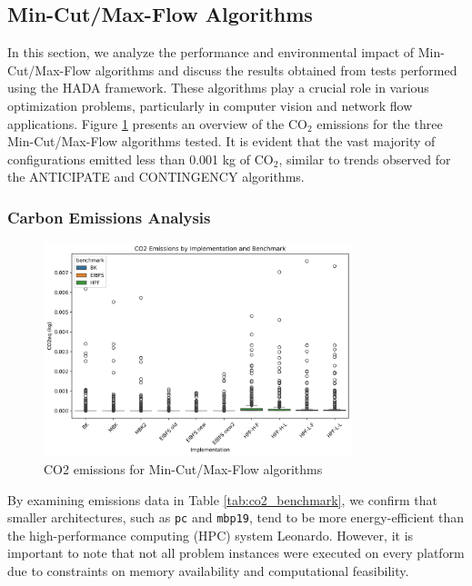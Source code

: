 \documentclass[a4paper,singleside,12pt]{report} %
\begin{document}
\subsection{Min-Cut/Max-Flow Algorithms}

In this section, we analyze the performance and environmental impact of Min-Cut/Max-Flow algorithms and discuss the results obtained from tests performed using the HADA framework. 
These algorithms play a crucial role in various optimization problems, particularly in computer vision and network flow applications. Figure \ref{fig:max_flow_emissions} presents an 
overview of the CO$_2$ emissions for the three Min-Cut/Max-Flow algorithms tested. It is evident that the vast majority of configurations emitted less than 0.001 kg of CO$_2$, 
similar to trends observed for the ANTICIPATE and CONTINGENCY algorithms.

\subsubsection{Carbon Emissions Analysis}

\begin{figure}[h!]
    \centering
    \includegraphics[width=0.8\textwidth]{imgs/max_flow_emissions.png}
    \caption{CO2 emissions for Min-Cut/Max-Flow algorithms}
    \label{fig:max_flow_emissions}
\end{figure}

By examining emissions data in Table \ref{tab:co2_benchmark}, we confirm that smaller architectures, such as \verb|pc| and \verb|mbp19|, tend to be more energy-efficient than the 
high-performance computing (HPC) system Leonardo. However, it is important to note that not all problem instances were executed on every platform due to constraints on memory 
availability and computational feasibility. 
\end{document}
